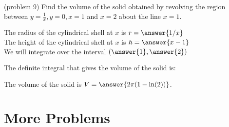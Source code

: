 \documentclass{ximera}
\begin{document}
\begin{problem}(problem 9)
Find the volume of the solid obtained by revolving the region between $y= \frac{1}{x}, y = 0, x = 1$ and $x=2$ about the line $x = 1$.


The radius of the cylindrical shell at $x$ is $r = \answer{1/x}$\\
The height of the cylindrical shell at $x$ is $h = \answer{x-1}$\\

We will integrate over the interval $\left(\answer{1},\answer{2}\right)$

The definite integral that gives the volume of the solid is:\\
\begin{multipleChoice}
\end{multipleChoice}

The volume of the solid is $V = \answer{2\pi(1-\ln(2)) }$.

\end{problem}

\begin{center}
\begin{foldable}
\end{foldable}
\end{center}



\section{More Problems}
\end{document}
